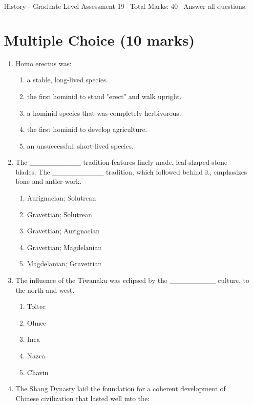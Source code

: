 \documentclass[12pt]{article}
\begin{document}
\begin{center}
History - Graduate Level Assessment 19 \
Total Marks: 40 \
Answer all questions.
\end{center}

\section*{Multiple Choice (10 marks)}
\begin{enumerate}[label=\arabic*.]
\item Homo erectus was:
\begin{enumerate}[label=(\alph*)]
    \item a stable, long-lived species.
    \item the first hominid to stand "erect" and walk upright.
    \item a hominid species that was completely herbivorous.
    \item the first hominid to develop agriculture.
    \item an unsuccessful, short-lived species.
\end{enumerate}
\item The \_\_\_\_\_\_\_\_\_\_ tradition features finely made, leaf-shaped stone blades. The \_\_\_\_\_\_\_\_\_\_ tradition, which followed behind it, emphasizes bone and antler work.
\begin{enumerate}[label=(\alph*)]
    \item Aurignacian; Solutrean
    \item Gravettian; Solutrean
    \item Gravettian; Aurignacian
    \item Gravettian; Magdelanian
    \item Magdelanian; Gravettian
\end{enumerate}
\item The influence of the Tiwanaku was eclipsed by the \_\_\_\_\_\_\_\_\_ culture, to the north and west.
\begin{enumerate}[label=(\alph*)]
    \item Toltec
    \item Olmec
    \item Inca
    \item Nazca
    \item Chavin
\end{enumerate}
\item The Shang Dynasty laid the foundation for a coherent development of Chinese civilization that lasted well into the:

\end{enumerate}
\end{document}
